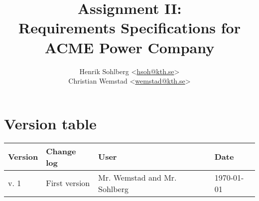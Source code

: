 \documentclass[a4paper]{article}
\title{Assignment II: \\Requirements Specifications for \\ACME Power Company}
\author{Henrik Sohlberg <\href{mailto:hsoh@kth.se}{hsoh@kth.se}> \\%
Christian Wemstad <\href{mailto:wemstad@kth.se}{wemstad@kth.se}> %
}
\begin{document}
\thispagestyle{empty}
\maketitle
\thispagestyle{empty}
\pagestyle{empty}
\newpage
\section*{Version table}
\label{sec:version_tabel}
\begin{table}[H]
	\centering
	\begin{tabular}{|l|l|l|l|}
		\hline
			\textbf{Version} & \textbf{Change log} & \textbf{User} & \textbf{Date}\\
		\hline
		     v. 1 & First version & Mr. Wemstad and Mr. Sohlberg & \today \\
		\hline
	\end{tabular}
\end{table}
\newpage       
\tableofcontents
\newpage
\pagestyle{fancy}
\setcounter{page}{1}










\clearpage


\clearpage


 
\end{document}
